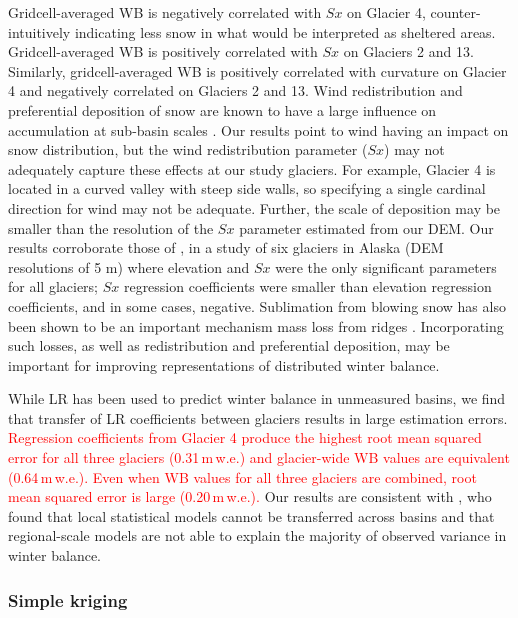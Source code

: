 \documentclass[review,oneside, letterpaper]{igs}
\begin{document}
Gridcell-averaged WB is negatively correlated with $Sx$ on Glacier 4, counter-intuitively indicating less snow in what would be interpreted as sheltered areas. Gridcell-averaged WB is positively correlated with $Sx$ on Glaciers 2 and 13. Similarly, gridcell-averaged WB is positively correlated with curvature on Glacier 4 and negatively correlated on Glaciers 2 and 13. Wind redistribution and preferential deposition of snow are known to have a large influence on accumulation at sub-basin scales \citep[e.g.][]{Dadic2010, Winstral2013,Gerber2017}. Our results point to wind having an impact on snow distribution, but the wind redistribution parameter ($Sx$) may not adequately capture these effects at our study glaciers. For example, Glacier 4 is located in a curved valley with steep side walls, so specifying a single cardinal direction for wind may not be adequate. Further, the scale of deposition may be smaller than the resolution of the $Sx$ parameter estimated from our DEM. Our results corroborate those of \cite{McGrath2015}, in a study of six glaciers in Alaska (DEM resolutions of 5 m) where elevation and $Sx$ were the only significant parameters for all glaciers; $Sx$ regression coefficients were smaller than elevation regression coefficients, and in some cases, negative. Sublimation from blowing snow has also been shown to be an important mechanism mass loss from ridges  \citep[e.g.][]{Musselman2015}. Incorporating such losses, as well as redistribution and preferential deposition, may be important for improving representations of distributed winter balance. 

While LR has been used to predict winter balance in unmeasured basins, we find that transfer of LR coefficients between glaciers results in large estimation errors. \textcolor{red}{Regression coefficients from Glacier 4 produce the highest root mean squared error for all three glaciers (0.31\,m\,w.e.) and glacier-wide WB values are equivalent (0.64\,m\,w.e.). Even when WB values for all three glaciers are combined, root mean squared error is large (0.20\,m\,w.e.). }Our results are consistent with \cite{Grunewald2013}, who found that local statistical models cannot be transferred across basins and that regional-scale models are not able to explain the majority of observed variance in winter balance. 

\subsubsection{Simple kriging}
\end{document}
